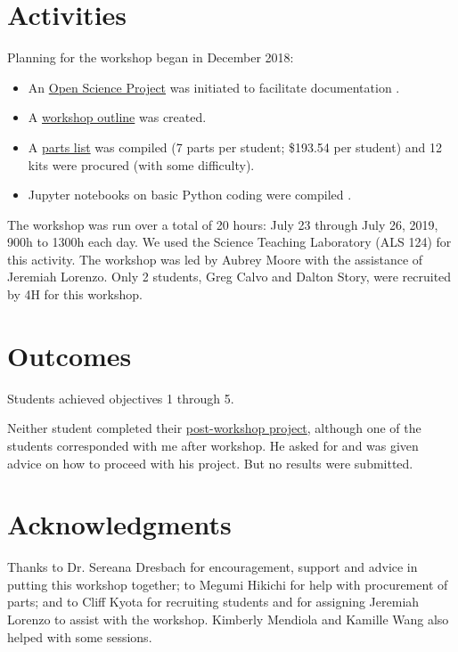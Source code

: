 \documentclass[12pt,letterpaper,english,bibliography=totocnumbered]{scrartcl}
\begin{document}
\section{Activities}
	
Planning for the workshop began in December 2018:

\begin{itemize}
	\item An \href{https://osf.io/ux6jn/wiki/home/}{Open Science Project} was initiated to facilitate documentation \cite{moore_open_2018}.
	\item A \href{https://osf.io/ux6jn/wiki/Workshop%20Outline/}{workshop outline} was created.
	\item A \href{https://osf.io/ux6jn/wiki/Parts%20List/}{parts list} was compiled (7 parts per student; \$193.54 per student) and 12 kits were procured (with some difficulty).
	\item Jupyter notebooks on basic Python coding were compiled \cite{moore_github_2019}.
\end{itemize}

The workshop was run over a total of 20 hours: July 23 through July 26, 2019, 900h to 1300h each day. We used the Science Teaching Laboratory (ALS 124) for this activity. The workshop was led by Aubrey Moore with the assistance of Jeremiah Lorenzo. Only 2 students, Greg Calvo and Dalton Story, were recruited by 4H for this workshop. 
		
\section{Outcomes}

Students achieved objectives 1 through 5.

Neither student completed their \href{https://osf.io/ux6jn/wiki/Time%20Lapse%20Video%20Assignment/}{post-workshop project}, although one of the students corresponded with me after workshop. He asked for and was given advice on how to proceed with his project. But no results were submitted.

\section{Acknowledgments}

Thanks to Dr. Sereana Dresbach for encouragement, support and advice in putting this workshop together; to Megumi Hikichi for help with procurement of parts;  and to Cliff Kyota for recruiting students and for assigning Jeremiah Lorenzo to assist with the workshop. Kimberly Mendiola and Kamille Wang also helped with some sessions.

\printbibliography
\end{document}
